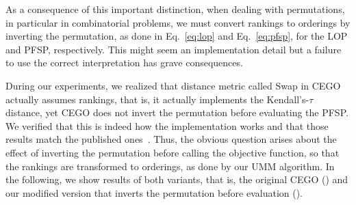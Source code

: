 \documentclass[sigconf,dvipsnames]{acmart}
\newcommand{\ken}{Kendall's-$\tau$\xspace}
\begin{document}
As a consequence of this important distinction, when dealing with  permutations, in particular in 
combinatorial problems, we must convert rankings to orderings by inverting the
permutation, as done in Eq.~\ref{eq:lop} and Eq.~\ref{eq:pfsp}, for the LOP and
PFSP, respectively. This might seem an implementation detail but a failure to use the correct interpretation has grave consequences.

During our experiments, we realized that distance metric called Swap in CEGO~\citep{ZaeStoBar2014:ppsn} actually assumes rankings, that is, it actually implements the \ken distance, yet CEGO does
not invert the permutation before evaluating the PFSP.
We verified that this is
indeed how the implementation works and that those results match the published
ones~\citep{ZaeStoBar2014:ppsn}. 
Thus, the obvious question arises about the effect of inverting the permutation before calling the objective
function, so that the rankings are transformed to orderings, as done by our UMM
algorithm. In the following, we show results of both variants, that is, the original CEGO (\CEGOorig) and our modified version that inverts the permutation before evaluation (\CEGOinv).
\end{document}
